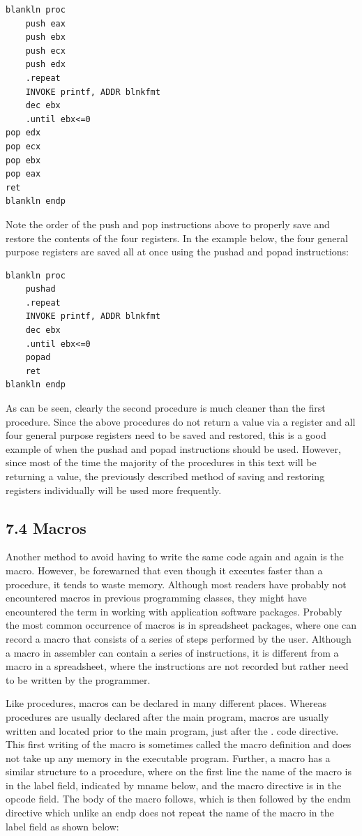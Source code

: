 \documentclass[10pt]{book}
\begin{document}
\begin{verbatim}
blankln proc
    push eax
    push ebx
    push ecx
    push edx
    .repeat
    INVOKE printf, ADDR blnkfmt
    dec ebx
    .until ebx<=0
pop edx
pop ecx
pop ebx
pop eax
ret
blankln endp
\end{verbatim}

Note the order of the push and pop instructions above to properly save and restore the contents of the four registers. In the example below, the four general purpose registers are saved all at once using the pushad and popad instructions:

\begin{verbatim}
blankln proc
    pushad
    .repeat
    INVOKE printf, ADDR blnkfmt
    dec ebx
    .until ebx<=0
    popad
    ret
blankln endp
\end{verbatim}

As can be seen, clearly the second procedure is much cleaner than the first procedure. Since the above procedures do not return a value via a register and all four general purpose registers need to be saved and restored, this is a good example of when the pushad and popad instructions should be used. However, since most of the time the majority of the procedures in this text will be returning a value, the previously described method of saving and restoring registers individually will be used more frequently.

\subsection*{7.4 Macros}
Another method to avoid having to write the same code again and again is the macro. However, be forewarned that even though it executes faster than a procedure, it tends to waste memory. Although most readers have probably not encountered macros in previous programming classes, they might have encountered the term in working with application software packages. Probably the most common occurrence of macros is in spreadsheet packages, where one can record a macro that consists of a series of steps performed by the user. Although a macro in assembler can contain a series of instructions, it is different from a macro in a spreadsheet, where the instructions are not recorded but rather need to be written by the programmer.

Like procedures, macros can be declared in many different places. Whereas procedures are usually declared after the main program, macros are usually written and located prior to the main program, just after the . code directive. This first writing of the macro is sometimes called the macro definition and does not take up any memory in the executable program. Further, a macro has a similar structure to a procedure, where on the first line the name of the macro is in the label field, indicated by mname below, and the macro directive is in the opcode field. The body of the macro follows, which is then followed by the endm directive which unlike an endp does not repeat the name of the macro in the label field as shown below:
\end{document}
